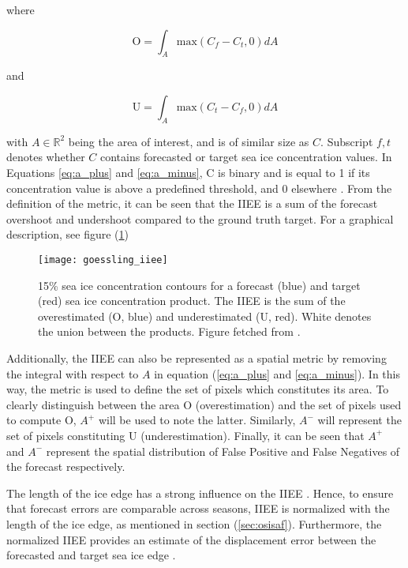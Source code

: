\documentclass[../main/thesis.tex]{subfiles}
\begin{document}
where 

\begin{equation}
    \label{eq:a_plus}
    \text{O} = \int_A\text{max}(C_f - C_t, 0)dA
\end{equation}

and

\begin{equation}
    \label{eq:a_minus}
    \text{U} = \int_A\text{max}(C_t - C_f, 0)dA
\end{equation}

with $A \in{\mathbb{R}^2}$ being the area of interest, and is of similar size as $C$. Subscript $f,t$ denotes whether $C$ contains forecasted or target sea ice concentration values. In Equations \ref{eq:a_plus} and \ref{eq:a_minus}, C is binary and is equal to 1 if its concentration value is above a predefined threshold, and 0 elsewhere \citep{Goessling2016}. From the definition of the metric, it can be seen that the IIEE is a sum of the forecast overshoot and undershoot compared to the ground truth target. For a graphical description, see figure (\ref{fig:goessling_iiee})

\begin{figure}
    \centering
    \texttt{[image: goessling\_iiee]}
    \caption{\label{fig:goessling_iiee}15\% sea ice concentration contours for a forecast (blue) and target (red) sea ice concentration product. The IIEE is the sum of the overestimated (O, blue) and underestimated (U, red). White denotes the union between the products. Figure fetched from \protect\citep{Goessling2016}.}
\end{figure}

Additionally, the IIEE can also be represented as a spatial metric by removing the integral with respect to $A$ in equation (\ref{eq:a_plus} and \ref{eq:a_minus}). In this way, the metric is used to define the set of pixels which constitutes its area. To clearly distinguish between the area O (overestimation) and the set of pixels used to compute O, $A^+$ will be used to note the latter. Similarly, $A^-$ will represent the set of pixels constituting U (underestimation). Finally, it can be seen that $A^+$ and $A^-$ represent the spatial distribution of False Positive and False Negatives of the forecast respectively.

The length of the ice edge has a strong influence on the IIEE \citep{Goessling2018,Palerme2019}. Hence, to ensure that forecast errors are comparable across seasons, IIEE is normalized with the length of the ice edge, as mentioned in section (\ref{sec:osisaf}). Furthermore, the normalized IIEE provides an estimate of the displacement error between the forecasted and target sea ice edge \citep{Melsom2019}.

\biblio
\end{document}
